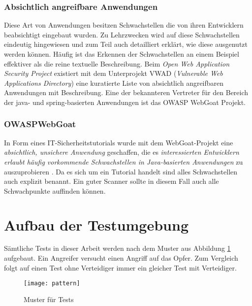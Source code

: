 \subsubsection{Absichtlich angreifbare Anwendungen}
\label{sec:absangan}
Diese Art von Anwendungen besitzen Schwachstellen die von ihren Entwicklern beabsichtigt eingebaut wurden. Zu Lehrzwecken wird auf diese Schwachstellen eindeutig hingewiesen und zum Teil auch detailliert erklärt, wie diese ausgenutzt werden können. Häufig ist das Erkennen der Schwachstellen an einem Beispiel effektiver als die reine textuelle Beschreibung. Beim \emph{Open Web Application Security Project} existiert mit dem Unterprojekt VWAD (\emph{Vulnerable Web Applications Directory}) eine kuratierte Liste von absichtlich angreifbaren Anwendungen mit Beschreibung. Eine der bekannteren Vertreter für den Bereich der java- und spring-basierten Anwendungen ist das OWASP WebGoat Projekt.

\subsubsection{OWASP\textregistered WebGoat}

In Form eines IT-Sicherheitstutorials wurde mit dem WebGoat-Projekt eine \emph{absichtlich, unsichere Anwendung} geschaffen, die es \emph{interessierten Entwicklern erlaubt häufig vorkommende Schwachstellen in Java-basierten Anwendungen} zu auszuprobieren \cite{owaspgoat}. Da es sich um ein Tutorial handelt sind alles Schwachstellen auch explizit benannt. Ein guter Scanner sollte in diesem Fall auch alle Schwachpunkte auffinden können. 


\section{Aufbau der Testumgebung}

Sämtliche Tests in dieser Arbeit werden nach dem Muster aus Abbildung \ref{fig.pattern} aufgebaut. Ein \glqq Angreifer\grqq{} versucht einen Angriff auf das \glqq Opfer\grqq. Zum Vergleich folgt auf einen Test ohne \glqq Verteidiger\grqq{} immer ein gleicher Test mit Verteidiger.

\begin{figure}[bht]
  \begin{center}
    \texttt{[image: pattern]}
    \caption{Muster für Tests}
    \label{fig.pattern}
  \end{center}
\end{figure}

